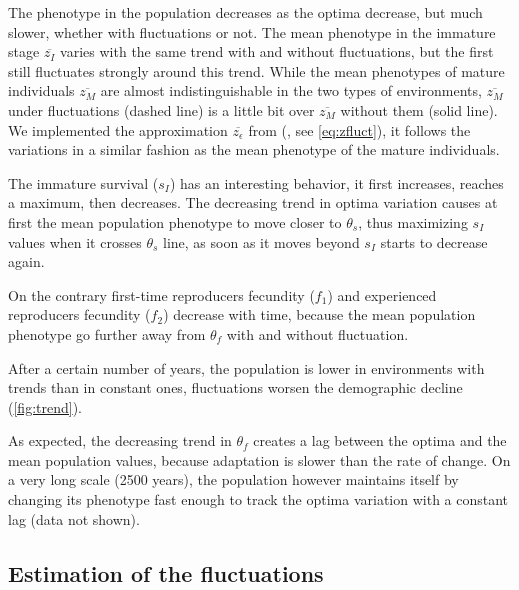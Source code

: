 The phenotype in the population decreases as the optima decrease, but much slower, whether with fluctuations or not. The mean phenotype in the immature stage $\overline{z_I}$ varies with the same trend with and without fluctuations,  but the first still fluctuates strongly around this trend. While the mean phenotypes of mature individuals $\overline{z_M}$ are almost indistinguishable in the two types of environments, $\overline{z_M}$ under fluctuations (dashed line) is a little bit over $\overline{z_M}$ without them (solid line). We implemented the approximation $\overline{z_\epsilon}$ from (\citealt{engen_evolution_2011}, see \autoref{eq:zfluct}), it follows the variations in a similar fashion as the mean phenotype of the mature individuals.

The immature survival ($s_I$) has an interesting behavior, it first increases, reaches a maximum, then decreases. The decreasing trend in optima variation causes at first the mean population phenotype to move closer to $\theta_s$, thus maximizing $s_I$ values when it crosses $\theta_s$ line, as soon as it moves beyond $s_I$ starts to decrease again.

On the contrary first-time reproducers fecundity ($f_1$) and experienced reproducers fecundity ($f_2$) decrease with time, because the mean population phenotype go further away from $\theta_f$ with and without fluctuation.

After a certain number of years, the population is lower in environments with trends than in constant ones, fluctuations worsen the demographic decline (\autoref{fig:trend}). 

As expected, the decreasing trend in $\theta_f$ creates a lag between the optima and the mean population values, because adaptation is slower than the rate of change. On a very long scale (2500 years), the population however maintains itself by changing its phenotype fast enough to track the optima variation with a constant lag (data not shown).

\subsection*{Estimation of the fluctuations}


